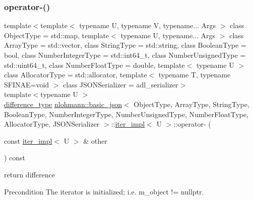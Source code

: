 \subsubsection{\texorpdfstring{operator-\/()}{operator-()}\hspace{0.1cm}{\footnotesize\ttfamily [2/2]}}
{\footnotesize\ttfamily template$<$template$<$ typename U, typename V, typename... Args $>$ class Object\+Type = std\+::map, template$<$ typename U, typename... Args $>$ class Array\+Type = std\+::vector, class String\+Type  = std\+::string, class Boolean\+Type  = bool, class Number\+Integer\+Type  = std\+::int64\+\_\+t, class Number\+Unsigned\+Type  = std\+::uint64\+\_\+t, class Number\+Float\+Type  = double, template$<$ typename U $>$ class Allocator\+Type = std\+::allocator, template$<$ typename T, typename S\+F\+I\+N\+A\+E=void $>$ class J\+S\+O\+N\+Serializer = adl\+\_\+serializer$>$ \\
template$<$typename U $>$ \\
\hyperlink{classnlohmann_1_1basic__json_1_1iter__impl_aa3d908ee643e5938d32e5f6d261d7715}{difference\+\_\+type} \hyperlink{classnlohmann_1_1basic__json}{nlohmann\+::basic\+\_\+json}$<$ Object\+Type, Array\+Type, String\+Type, Boolean\+Type, Number\+Integer\+Type, Number\+Unsigned\+Type, Number\+Float\+Type, Allocator\+Type, J\+S\+O\+N\+Serializer $>$\+::\hyperlink{classnlohmann_1_1basic__json_1_1iter__impl}{iter\+\_\+impl}$<$ U $>$\+::operator-\/ (\begin{DoxyParamCaption}\item[{const \hyperlink{classnlohmann_1_1basic__json_1_1iter__impl}{iter\+\_\+impl}$<$ U $>$ \&}]{other }\end{DoxyParamCaption}) const\hspace{0.3cm}{\ttfamily [inline]}}



return difference 

\begin{DoxyPrecond}{Precondition}
The iterator is initialized; i.\+e. {\ttfamily m\+\_\+object != nullptr}. 
\end{DoxyPrecond}
\mbox{\label{classnlohmann_1_1basic__json_1_1iter__impl_a0c3a102ac61d4c6f869fe9a5d065e91e}} 
